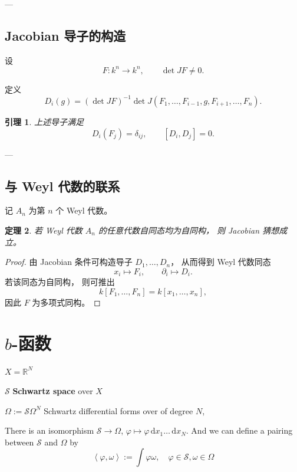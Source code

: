 \documentclass[11pt]{article}
\theoremstyle{plain}
\newtheorem{theorem}{定理}[section]
\newtheorem{lemma}[theorem]{引理}
\theoremstyle{definition}
\theoremstyle{remark}
\renewcommand{\d}{\, \mathrm{d}}
\renewcommand{\det}{\operatorname{det}}
\begin{document}
---

\subsection{Jacobian 导子的构造}

设
\[
    F:k^n\to k^n,
    \qquad
    \det JF\neq0.
\]

定义
\[
    D_i(g)
    =
    (\det JF)^{-1}
    \det
    J(F_1,\dots,F_{i-1},g,F_{i+1},\dots,F_n).
\]

\begin{lemma}
    上述导子满足
    \[
        D_i(F_j)=\delta_{ij},
        \qquad
        [D_i,D_j]=0.
    \]
\end{lemma}

---

\subsection{与 Weyl 代数的联系}

记 $A_n$ 为第 $n$ 个 Weyl 代数。

\begin{theorem}
    若 Weyl 代数 $A_n$ 的任意代数自同态均为自同构，
    则 Jacobian 猜想成立。
\end{theorem}

\begin{proof}
    由 Jacobian 条件可构造导子
    $D_1,\dots,D_n$，
    从而得到 Weyl 代数同态
    \[
        x_i\mapsto F_i,
        \qquad
        \partial_i\mapsto D_i.
    \]
    若该同态为自同构，
    则可推出
    \[
        k[F_1,\dots,F_n]
        =
        k[x_1,\dots,x_n],
    \]
    因此 $F$ 为多项式同构。
\end{proof}
\section{$b$-函数}
$X=\mathbb{R}^N$



$\mathcal{S}$ \textbf{Schwartz space} over $X$

$\Omega:= \mathcal{S}\Omega^N$ Schwartz differential forms over of degree $N$,

There is an isomorphism $\mathcal{S}\to \Omega$, $\varphi\mapsto \varphi \d x_1\ldots \d x_N $. And we can define a pairing between $\mathcal{S}$ and $\Omega$ by
\begin{equation*}
    \left\langle \varphi, \omega \right\rangle:= \int \varphi \omega, \quad \varphi\in \mathcal{S}, \omega\in \Omega
\end{equation*}
\end{document}
